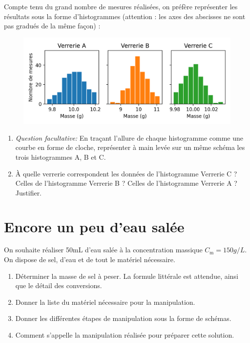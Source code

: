 Compte tenu du grand nombre de mesures réalisées, on préfère représenter les résultats sous la forme d'histogrammes (attention : les axes des abscisses ne sont pas gradués de la même façon) :
\begin{figure}[h]
\center
\includegraphics[scale=1]{../images/precision_verrerie.png}
\end{figure}
\begin{enumerate}[resume]
\item \emph{Question facultative:} En traçant l'allure de chaque histogramme comme une courbe en forme de cloche, représenter à main levée sur un même schéma les trois histogrammes A, B et C.
\item À quelle verrerie correspondent les données de l'histogramme \og Verrerie C \fg{} ?
Celles de l'histogramme \og Verrerie B \fg{} ?
Celles de l'histogramme \og Verrerie A \fg{} ?
Justifier.
\end{enumerate}

\section{Encore un peu d'eau salée}

On souhaite réaliser \unit{50}{mL} d'eau salée à la concentration massique $C_\mathrm{m} = \unit{150}{g/L}$.
On dispose de sel, d'eau et de tout le matériel nécessaire.
\begin{enumerate}[resume]
\item Déterminer la masse de sel à peser.
La formule littérale est attendue, ainsi que le détail des conversions.
\item Donner la liste du matériel nécessaire pour la manipulation.
\item Donner les différentes étapes de manipulation sous la forme de schémas.
\item Comment s'appelle la manipulation réalisée pour préparer cette solution.
\end{enumerate}


